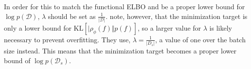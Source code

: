 \documentclass[]{uai2021} %
\newcommand{\defeq}{\vcentcolon=}
\newcommand{\E}{\mathbb{E}}
\newcommand{\D}{\mathcal{D}}
\newcommand{\B}{\mathcal{B}}
\newcommand{\KL}{\mathrm{KL}}
\begin{document}
In order for this to match the functional ELBO and be a proper lower bound
for \(\log p(\D)\), \(\lambda\) should be set as \(\frac{1}{\lvert \D \rvert}\).
\cite{sun_functional_2019} note, however, that the minimization target is only a lower
bound for \(\KL \left[ \lvert \rho_\phi(f) \Vert p(f) \right]\), so a larger
value for \(\lambda\) is likely necessary to prevent overfitting. They use,
\(\lambda = \frac{1}{\lvert D_s \rvert}\), a value of one over the batch size instead.
This means that the minimization target becomes a proper lower bound of \(\log p(\D_s)\).




\end{document}
